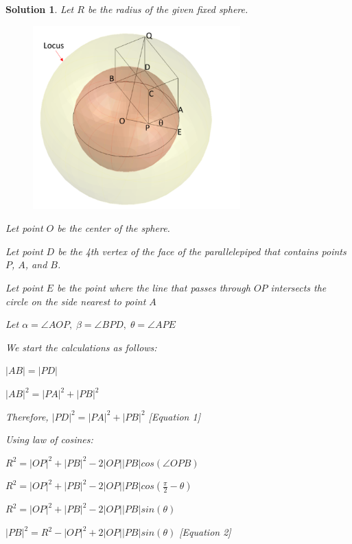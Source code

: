 \documentclass[12pt]{article}
\newtheorem*{solution*}{Solution}
\begin{document}
\begin{solution*}

Let $R$ be the radius of the given fixed sphere.
\begin{figure}[H]
    \centering
    \includegraphics[width=8cm]{locus.png}
    \label{fig:node-1}
\end{figure}
Let point $O$ be the center of the sphere.

Let point $D$ be the 4th vertex of the face of the parallelepiped that contains points $P$, $A$, and $B$.

Let point $E$ be the point where the line that passes through $OP$ intersects the circle on the side nearest to point $A$

Let $\alpha=\angle AOP,\;\beta=\angle BPD,\;\theta=\angle APE$

We start the calculations as follows:

$\left| AB \right|= \left| PD \right|$

$\left| AB \right|^{2}=\left| PA \right|^{2}+\left| PB \right|^{2}$

Therefore, $\left| PD \right|^{2}=\left| PA \right|^{2}+\left| PB \right|^{2}$ [Equation 1]

Using law of cosines:

$R^{2}=\left| OP \right|^{2} + \left| PB \right|^{2} - 2 \left| OP \right| \left| PB \right| cos (\angle OPB)$

$R^{2}=\left| OP \right|^{2} + \left| PB \right|^{2} - 2 \left| OP \right| \left| PB \right| cos \left( \frac{\pi}{2}-\theta \right)$

$R^{2}=\left| OP \right|^{2} + \left| PB \right|^{2} - 2 \left| OP \right| \left| PB \right| sin (\theta)$

$\left| PB \right|^{2} =R^{2}-\left| OP \right|^{2} + 2 \left| OP \right| \left| PB \right| sin (\theta)$ [Equation 2]


\end{solution*}
\end{document}
